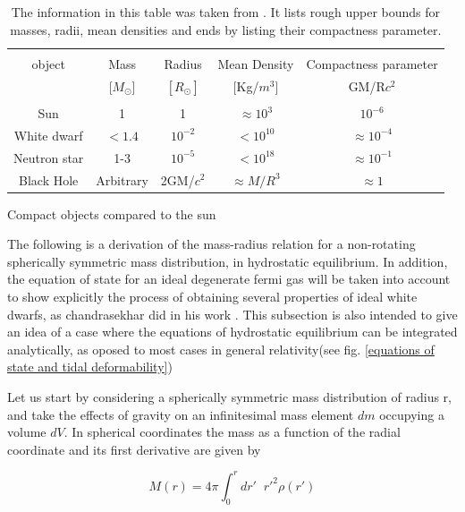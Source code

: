 \begin{table}[!htbp]
\begin{center}
\begin{tabular}{ccccc}
\hline\\
object &Mass&Radius& Mean Density& Compactness parameter \\
       & [$M_\odot$]& $[R_\odot]$& [Kg/$m^3$]& GM/R$c^2$  \\
\hline \\
Sun           &1          &1         &$\approx 10^{3}$   &$ 10^{-6}$ \\
White dwarf   &$< 1.4$ &$10^{-2}$    &$< 10^{10}$        &$\approx 10^{-4}$ \\
Neutron star  &1-3        &$10^{-5}$ &$< 10^{18}$        &$\approx 10^{-1}$ \\
Black Hole    &Arbitrary  &2GM/$c^2$ & $\approx M/R^{3}$ & $\approx 1$ \\
\hline
\end{tabular}
\captionsetup{width=.8\textwidth}
\caption{Compact objects compared to the sun}
\caption*{The information in this table was taken from \cite{Shapiro:1983du}. It lists rough upper bounds for masses, radii, mean densities and ends by listing their compactness parameter.}
\label{compactness}
\end{center}
\end{table}

The following is a derivation of the mass-radius relation for a non-rotating spherically symmetric mass distribution, in hydrostatic equilibrium. In addition, the equation of state for an ideal degenerate fermi gas will be taken into account to show explicitly the process of obtaining several properties of ideal white dwarfs, as chandrasekhar did in his work \cite{Chandrasekhar:1931ih}. This subsection is also intended to give an idea of a case where the equations of hydrostatic equilibrium can be integrated analytically, as oposed to most cases in general relativity(see fig. \ref{equations of state and tidal deformability})

Let us start by considering a spherically symmetric mass distribution of radius r, and take the effects of gravity on an infinitesimal mass element $dm$ occupying a volume $dV$. In spherical coordinates the mass as a function of the radial coordinate and its first derivative are given by


\begin{equation}\label{mass}
M(r) = 4\pi  \int_0^{r} dr' \;\; r'^2 \rho(r') 
\end{equation}

